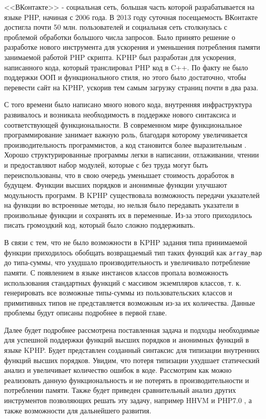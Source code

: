 \startprefacepage
<<ВКонтакте>> - социальная сеть, большая часть которой разрабатывается на языке PHP, начиная с 2006 года.
В 2013 году суточная посещаемость ВКонтакте достигла почти 50 млн. пользователей \cite{kphp-vk-2013} и социальная сеть столкнулась с проблемой обработки большого числа запросов.
Было принято решение о разработке нового инструмента для ускорения и уменьшения потребления памяти занимаемой работой PHP скрипта.
KPHP был разработан для ускорения, написанного кода, который транслировал PHP код в C++.
По факту не было поддержки ООП и функционального стиля, но этого было достаточно, чтобы перевести сайт на KPHP, ускорив тем самым загрузку страниц почти в два раза.

С того времени было написано много нового кода, внутренняя инфраструктура развивалось и возникала необходимость в поддержке нового синтаксиса и соответствующей функциональности.
В современном мире функциональное программирование занимает важную роль, благодаря которому увеличивается производительность программистов, а код становится более выразительным \cite{fp-matters}.
Хорошо структурированные программы легки в написании, отлаживании, чтении и предоставляют набор модулей, которые с без труда могут быть переиспользованы, что в свою очередь уменьшает стоимость доработок в будущем. Функции высших порядков и анонимные функции улучшают модульность программ.
В KPHP существовала возможность передачи указателей на функции во встроенные методы, но нельзя было передавать указатели в произвольные функции и сохранять их в переменные.
Из-за этого приходилось писать громоздкий код, который было сложно поддерживать.

В связи с тем, что не было возможности в KPHP задания типа принимаемой функции приходилось обобщать возвращаемый тип таких функций как \verb|array_map| до типа-суммы, что ухудшало производительность и увеличивало потребление памяти.
С появлением в языке инстансов классов пропала возможность использования стандартных функций с массивом экземпляров классов, т. к. генерировать все возможные типы-суммы из пользовательских классов и примитивных типов не представляется возможным из-за их количества.
Данные проблемы будут описаны подробнее в первой главе.

Далее будет подробнее рассмотрена поставленная задача и подходы необходимые для успешной поддержки функций высших порядков и анонимных функций в языке KPHP.
Будет представлен созданный синтаксис для типизации внутренних функций высших порядков.
Увидим, что потеря типизации ухудшает статический анализ и увеличивает количество ошибок в коде.
Рассмотрим как можно реализовать данную функциональность и не потерять в производительности и потреблении памяти.
Также будет приведен сравнительный анализ других инструментов позволяющих решать эту задачу, например HHVM \cite{hhvm} и PHP7.0 \cite{php7}, а также возможности для дальнейшего развития.
